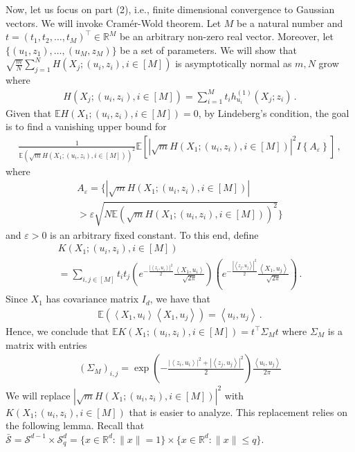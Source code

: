 \documentclass[12pt]{article}
\renewcommand{\exp}[1]{\operatorname{exp}\left(#1\right)} %
\newcommand{\eps}{\varepsilon}
\def\l{\left}
\def\r{\right}
\newcommand{\mb}{\mathbb}
\newcommand{\dotp}[2]{\left\langle#1,#2\right\rangle}
\theoremstyle{thmstyletwo}%
\theoremstyle{thmstylethree}%
\begin{document}
Now, let us focus on part (2), i.e., finite dimensional convergence to Gaussian vectors. We will invoke Cram\'{e}r-Wold theorem. Let $M$ be a natural number and $t = (t_1, t_2, \ldots, t_M)^\top \in \mb R^M$ be an arbitrary non-zero real vector. Moreover, let $\{(u_1, z_1), \ldots, (u_M, z_M)\}$ be a set of parameters. We will show that $\sqrt{\frac{m}{N}}\sum_{j=1}^N H (X_j; (u_i, z_i), i \in [M])$ is asymptotically normal as $m,N$ grow where
\begin{align}\label{eq:H}
    H (X_j; (u_i, z_i), i \in [M]) = \sum_{i = 1}^M t_i h^{(1)}_{u_i} (X_j;z_i)\,.
\end{align}
Given that $\mb E H (X_1; (u_i, z_i), i \in [M]) = 0$, by Lindeberg's condition, the goal is to find a vanishing upper bound for 
\begin{align}
\label{eq:Lindeberg}
    \frac{1}{\mb E \l(\sqrt{m}H(X_1; (u_i, z_i), i \in [M])\r)^2} \mb E \l[\l\lvert\sqrt{m} H(X_1; (u_i, z_i), i \in [M]) \r\rvert^2 I \l\{A_\eps \r\}\r]\,,
\end{align}
where
\begin{multline}\label{eq:A_epsilon}
    A_\eps = \Biggl\{ \l\lvert \sqrt{m} H(X_1; (u_i, z_i), i \in [M])\r\rvert \\
    > \varepsilon \sqrt{N \mb E \l(\sqrt{m}H(X_1; (u_i, z_i), i \in [M])\r)^2 }\Biggr\}
\end{multline}
and $\varepsilon > 0$ is an arbitrary fixed constant. To this end, define
\begin{multline*}
    K(X_1; (u_i, z_i), i \in [M]) \\
    = \sum_{i, j \in [M]} t_i t_{j} \l(e^{-\frac{\l\lvert \dotp{z_i}{u_i}\r\rvert^2}{2}}\frac{\dotp{X_1}{u_i}}{\sqrt{2\pi}}\r)\l(e^{-\frac{\l\lvert \dotp{z_{j}}{u_{j}}\r\rvert^2}{2}}\frac{\dotp{X_1}{u_j}}{\sqrt{2\pi}}\r)\,.
\end{multline*}
Since $X_1$ has covariance matrix $I_d$, we have that
\begin{align*}
    \mb E \l(\dotp{X_1}{u_i}\dotp{X_1}{u_{j}}\r)  = \dotp{u_i}{u_{j}}\,.
\end{align*}
Hence, we conclude that $\mb E K(X_1; (u_i, z_i), i \in [M]) = t^\top \Sigma_M t$ where $\Sigma_M$ is a matrix with entries
\begin{align*}
    \l(\Sigma_M\r)_{i,j} = \exp{-\frac{\l\lvert \dotp{z_{i}}{u_{i}}\r\rvert^2 + \l\lvert \dotp{z_j}{u_j}\r\rvert^2}{2}}\frac{\dotp{u_i}{u_{j}}}{2\pi}
\end{align*}
We will replace $\l\lvert\sqrt{m} H(X_1; (u_i, z_i), i \in [M]) \r\rvert^2$ with $K(X_1; (u_i, z_i), i \in [M])$ that is easier to analyze. This replacement relies on the following lemma. Recall that $\bar{\mathcal{S}} = \mathcal{S}^{d-1} \times \mathcal{S}^d_q = \{x \in \mb R^d : \|x\| = 1\} \times \{x \in \mb R^d: \|x\| \leq q\}$.
\end{document}
